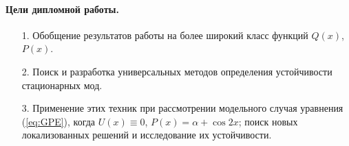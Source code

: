 \paragraph{Цели дипломной работы.}
\begin{itemize}
\item[1.] Обобщение результатов работы \cite{AlfAvr} на более широкий класс функций $Q(x)$, $P(x)$.
\item[2.] Поиск и разработка универсальных методов определения устойчивости стационарных мод.
\item[3.] Применение этих техник при рассмотрении модельного случая уравнения (\ref{eq:GPE}), когда $U(x) \equiv 0$, $P(x) = \alpha + \cos 2x$; поиск новых локализованных решений и исследование их устойчивости.
\end{itemize}